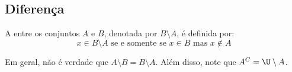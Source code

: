 \subsection{Diferença}

\begin{definition}
\label{def:setminus}
A  entre os conjuntos $A$ e $B$, denotada por $B\setminus A$, é definida por:
%
	$$ x \in  B \setminus A \text{ se e somente se }  x \in B \text{ mas } x \notin A $$
\end{definition}
\begin{remark}
Em geral, não é verdade que $A \setminus B = B \setminus A$. Além disso, note que $A^C = \U\setminus A$.
\end{remark}

